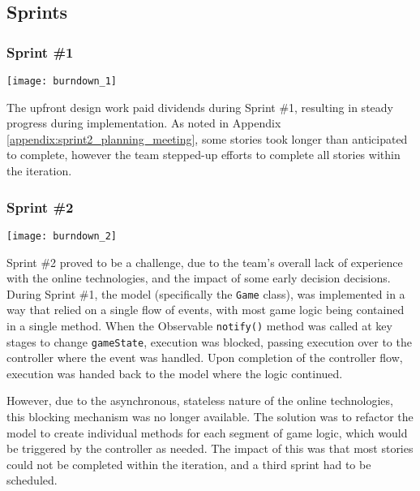\subsection{Sprints}

\subsubsection{Sprint \#1}

\begin{center}
	\texttt{[image: burndown\_1]}
	\label{figure:burndown_1}
\end{center}

The upfront design work paid dividends during Sprint \#1, resulting in steady progress during implementation.
As noted in Appendix \ref{appendix:sprint2_planning_meeting}, some stories took longer than anticipated to complete, however the team stepped-up efforts to complete all stories within the iteration.

\subsubsection{Sprint \#2}

\begin{center}
	\texttt{[image: burndown\_2]}
	\label{figure:burndown_2}
\end{center}

Sprint \#2 proved to be a challenge, due to the team's overall lack of experience with the online technologies, and the impact of some early decision decisions.
During Sprint \#1, the model (specifically the \texttt{Game} class), was implemented in a way that relied on a single flow of events, with most game logic being contained in a single method. When the Observable \texttt{notify()} method was called at key stages to change \texttt{gameState}, execution was blocked, passing execution over to the controller where the event was handled. Upon completion of the controller flow, execution was handed back to the model where the logic continued.

However, due to the asynchronous, stateless nature of the online technologies, this blocking mechanism was no longer available.
The solution was to refactor the model to create individual methods for each segment of game logic, which would be triggered by the controller as needed.
The impact of this was that most stories could not be completed within the iteration, and a third sprint had to be scheduled.

